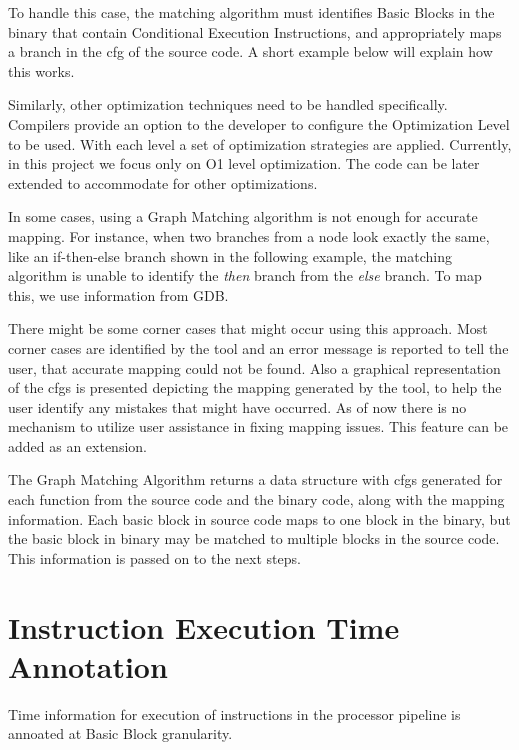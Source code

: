 To handle this case, the matching algorithm must identifies Basic Blocks in the binary that contain Conditional Execution Instructions, and appropriately maps a branch in the \gls{cfg} of the source code. A short example below will explain how this works.


Similarly, other optimization techniques need to be handled specifically. Compilers provide an option to the developer to configure the Optimization Level to be used. With each level a set of optimization strategies are applied. Currently, in this project we focus only on O1 level optimization. The code can be later extended to accommodate for other optimizations.

In some cases, using a Graph Matching algorithm is not enough for accurate mapping. For instance, when two branches from a node look exactly the same, like an if-then-else branch shown in the following example, the matching algorithm is unable to identify the \textit{then} branch from the \textit{else} branch. To map this, we use information from GDB.

There might be some corner cases that might occur using this approach. Most corner cases are identified by the tool and an error message is reported to tell the user, that accurate mapping could not be found. Also a graphical representation of the \gls{cfg}s is presented depicting the mapping generated by the tool, to help the user identify any mistakes that might have occurred. As of now there is no mechanism to utilize user assistance in fixing mapping issues. This feature can be added as an extension.

The Graph Matching Algorithm returns a data structure with \gls{cfg}s generated for each function from the source code and the binary code, along with the mapping information. Each basic block in source code maps to one block in the binary, but the basic block in binary may be matched to multiple blocks in the source code. This information is passed on to the next steps.

\section{Instruction Execution Time Annotation}
Time information for execution of instructions in the processor pipeline is annoated at Basic Block granularity. 







